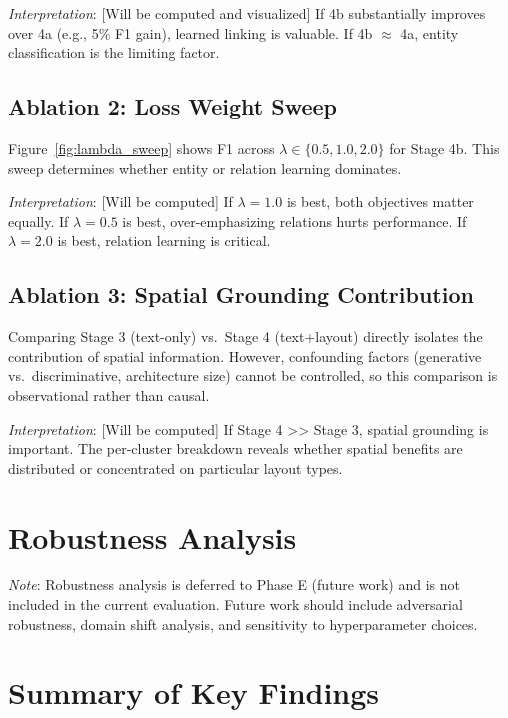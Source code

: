 \textit{Interpretation}: [Will be computed and visualized] If 4b substantially improves over 4a (e.g., 5\% F1 gain), learned linking is valuable. If 4b $\approx$ 4a, entity classification is the limiting factor.

\subsection{Ablation 2: Loss Weight Sweep}
\label{sec:ablation_lambda_sweep}

Figure~\ref{fig:lambda_sweep} shows F1 across $\lambda \in \{0.5, 1.0, 2.0\}$ for Stage 4b. This sweep determines whether entity or relation learning dominates.

\textit{Interpretation}: [Will be computed] If $\lambda=1.0$ is best, both objectives matter equally. If $\lambda=0.5$ is best, over-emphasizing relations hurts performance. If $\lambda=2.0$ is best, relation learning is critical.

\subsection{Ablation 3: Spatial Grounding Contribution}
\label{sec:ablation_spatial}

Comparing Stage 3 (text-only) vs.\ Stage 4 (text+layout) directly isolates the contribution of spatial information. However, confounding factors (generative vs.\ discriminative, architecture size) cannot be controlled, so this comparison is observational rather than causal.

\textit{Interpretation}: [Will be computed] If Stage 4 >> Stage 3, spatial grounding is important. The per-cluster breakdown reveals whether spatial benefits are distributed or concentrated on particular layout types.

\section{Robustness Analysis}
\label{sec:robustness}

\textit{Note}: Robustness analysis is deferred to Phase E (future work) and is not included in the current evaluation. Future work should include adversarial robustness, domain shift analysis, and sensitivity to hyperparameter choices.

\section{Summary of Key Findings}
\label{sec:results_summary}

